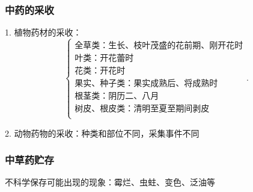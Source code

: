 \subsubsection*{中药的采收}%
\label{subsub:中药的采收}
1. 植物药材的采收：
\[
    \begin{cases}
        \text{全草类：生长、枝叶茂盛的花前期、刚开花时}\\ 
        \text{叶类：开花蕾时}\\ 
        \text{花类：开花时}\\ 
        \text{果实、种子类：果实成熟后、将成熟时}\\ 
        \text{根茎类：阴历二、八月}\\ 
        \text{树皮、根皮类：清明至夏至期间剥皮}\\ 
    \end{cases}
.\] 

2. 动物药物的采收：种类和部位不同，采集事件不同

\subsubsection*{中草药贮存}%
\label{subsub:中草药贮存}
\begin{notation}
    不科学保存可能出现的现象：霉烂、虫蛀、变色、泛油等
\end{notation}
